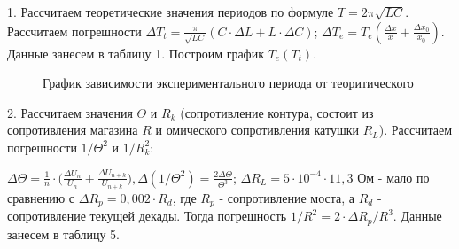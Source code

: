 \documentclass[a4paper,12pt]{article}
\begin{document}
\par 1. Рассчитаем теоретические значения периодов по формуле $T = 2\pi \sqrt{LC}$. Рассчитаем погрешности $\Delta T_t = \frac{\pi}{\sqrt{LC}}(C \cdot \Delta L + L \cdot \Delta C) $; $\Delta T_e = T_e (\frac{\Delta x}{x} + \frac{\Delta x_0}{x_0}) $. Данные занесем в таблицу 1. Построим график $T_{e}(T_{t})$.
\begin{figure}
	\centering
	\caption{График зависимости экспериментального периода от теоритического}
	\label{mah}
\end{figure}

\par 2. Рассчитаем значения $\Theta$  и $R_k$ (сопротивление контура, состоит из сопротивления магазина $R$ и омического сопротивления катушки $R_L$). Рассчитаем погрешности $1/\Theta^2$ и $1/R^2_k$: 
\par $\Delta \Theta = \frac{1}{n} \cdot \Big(\frac{\Delta U_n}{U_n} + \frac{\Delta U_{n+k}}{U_{n+k}}), \Delta (1/\Theta^2) = \frac{2\Delta \Theta}{\Theta^3}$; $\Delta R_L = 5 \cdot 10^{-4} \cdot 11,3$ Ом  - мало по сравнению с $\Delta R_p = 0,002 \cdot R_d$, где $R_p$ - сопротивление моста, а $R_d$ - сопротивление текущей декады. Тогда погрешность $1/R^2 = 2 \cdot \Delta R_p / R^3$. Данные занесем в таблицу 5.
\end{document}
